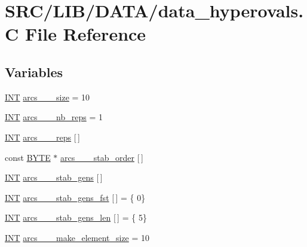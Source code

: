 \hypertarget{data__hyperovals_8_c}{}\section{S\+R\+C/\+L\+I\+B/\+D\+A\+T\+A/data\+\_\+hyperovals.C File Reference}
\label{data__hyperovals_8_c}
\subsection*{Variables}
\begin{DoxyCompactItemize}
\item 
\mbox{\hyperlink{galois_8h_a09fddde158a3a20bd2dcadb609de11dc}{I\+NT}} \mbox{\hyperlink{data__hyperovals_8_c_ad2504de4540a02e2228c11f9f09ecff2}{arcs\+\_\+\_\+\_\+size}} = 10
\item 
\mbox{\hyperlink{galois_8h_a09fddde158a3a20bd2dcadb609de11dc}{I\+NT}} \mbox{\hyperlink{data__hyperovals_8_c_ac7e1e85c10ffd4ed68d47b56d966ac38}{arcs\+\_\+\_\+\_\+nb\+\_\+reps}} = 1
\item 
\mbox{\hyperlink{galois_8h_a09fddde158a3a20bd2dcadb609de11dc}{I\+NT}} \mbox{\hyperlink{data__hyperovals_8_c_ab01a06bcabd15406ed515fbdba3575f2}{arcs\+\_\+\_\+\_\+reps}} \mbox{[}$\,$\mbox{]}
\item 
const \mbox{\hyperlink{galois_8h_ab6cc7b4aeb6ea31aba2b3fbfc83ff5e6}{B\+Y\+TE}} $\ast$ \mbox{\hyperlink{data__hyperovals_8_c_a3625e610fe2b56d333d0e4137606c9c1}{arcs\+\_\+\_\+\_\+stab\+\_\+order}} \mbox{[}$\,$\mbox{]}
\item 
\mbox{\hyperlink{galois_8h_a09fddde158a3a20bd2dcadb609de11dc}{I\+NT}} \mbox{\hyperlink{data__hyperovals_8_c_a84065ef6fdffbcab9742051cb05b98f5}{arcs\+\_\+\_\+\_\+stab\+\_\+gens}} \mbox{[}$\,$\mbox{]}
\item 
\mbox{\hyperlink{galois_8h_a09fddde158a3a20bd2dcadb609de11dc}{I\+NT}} \mbox{\hyperlink{data__hyperovals_8_c_a72ddb5957398b41b3350ccedaab8c962}{arcs\+\_\+\_\+\_\+stab\+\_\+gens\+\_\+fst}} \mbox{[}$\,$\mbox{]} = \{ 0\}
\item 
\mbox{\hyperlink{galois_8h_a09fddde158a3a20bd2dcadb609de11dc}{I\+NT}} \mbox{\hyperlink{data__hyperovals_8_c_a1cd43d636a0f559f0945e767d3b791ef}{arcs\+\_\+\_\+\_\+stab\+\_\+gens\+\_\+len}} \mbox{[}$\,$\mbox{]} = \{ 5\}
\item 
\mbox{\hyperlink{galois_8h_a09fddde158a3a20bd2dcadb609de11dc}{I\+NT}} \mbox{\hyperlink{data__hyperovals_8_c_a3443a028d7f8d56926e990bfadca9b1f}{arcs\+\_\+\_\+\_\+make\+\_\+element\+\_\+size}} = 10

\end{DoxyCompactItemize}

